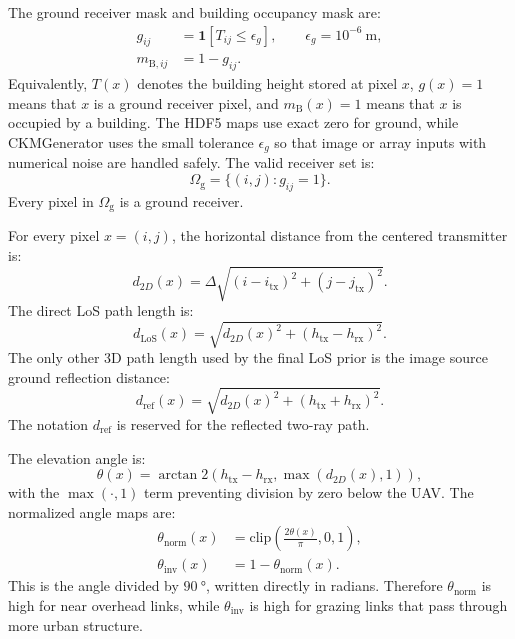 The ground receiver mask and building occupancy mask are:
\begin{align}
  g_{ij}
  &=
  \mathbf{1}\!\left[T_{ij}\le \epsilon_g\right],
  \qquad \epsilon_g=10^{-6}\ \mathrm{m},
  \label{eq:ground_mask}\\
  m_{\mathrm{B},ij}
  &=1-g_{ij}.
  \label{eq:building_mask}
\end{align}
Equivalently, \(T(x)\) denotes the building height stored at pixel \(x\),
\(g(x)=1\) means that \(x\) is a ground receiver pixel, and
\(m_{\mathrm{B}}(x)=1\) means that \(x\) is occupied by a building.
The HDF5 maps use exact zero for ground, while CKMGenerator uses the small
tolerance \(\epsilon_g\) so that image or array inputs with numerical noise are
handled safely. The valid receiver set is:
\begin{equation}
  \Omega_{\mathrm{g}}=\{(i,j):g_{ij}=1\}.
  \label{eq:ground_receiver_set}
\end{equation}
Every pixel in \(\Omega_{\mathrm{g}}\) is a ground receiver.

For every pixel \(x=(i,j)\), the horizontal distance from the centered
transmitter is:
\begin{equation}
  d_{2D}(x)
  =
  \Delta
  \sqrt{(i-i_{\mathrm{tx}})^2+(j-j_{\mathrm{tx}})^2}.
  \label{eq:d2d_support}
\end{equation}
The direct LoS path length is:
\begin{equation}
  d_{\mathrm{LoS}}(x)
  =
  \sqrt{d_{2D}(x)^2+\left(h_{\mathrm{tx}}-h_{\mathrm{rx}}\right)^2}.
  \label{eq:dlos_support}
\end{equation}
The only other 3D path length used by the final LoS prior is the image source
ground reflection distance:
\begin{equation}
  d_{\mathrm{ref}}(x)
  =
  \sqrt{d_{2D}(x)^2+\left(h_{\mathrm{tx}}+h_{\mathrm{rx}}\right)^2}.
  \label{eq:dref_support}
\end{equation}
The notation \(d_{\mathrm{ref}}\) is reserved for the reflected two-ray path.

The elevation angle is:
\begin{equation}
  \theta(x)
  =
  \arctan2\!\left(h_{\mathrm{tx}}-h_{\mathrm{rx}},\max(d_{2D}(x),1)\right),
  \label{eq:elevation_support}
\end{equation}
with the \(\max(\cdot,1)\) term preventing division by zero below the UAV. The
normalized angle maps are:
\begin{align}
  \theta_{\mathrm{norm}}(x)
  &=
  \mathrm{clip}\!\left(\frac{2\theta(x)}{\pi},0,1\right),
  \label{eq:theta_norm_support}\\
  \theta_{\mathrm{inv}}(x)
  &=1-\theta_{\mathrm{norm}}(x).
  \label{eq:theta_inv_support}
\end{align}
This is the angle divided by \(\SI{90}{\degree}\), written directly in radians.
Therefore \(\theta_{\mathrm{norm}}\) is high for near overhead links, while
\(\theta_{\mathrm{inv}}\) is high for grazing links that pass through more urban
structure.

